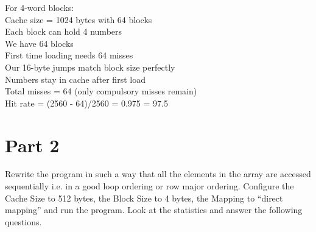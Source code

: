\documentclass{article}\\
\begin{document}
\begin{enumerate}
    For 4-word blocks:\\
    Cache size = 1024 bytes with 64 blocks\\
    Each block can hold 4 numbers\\
    We have 64 blocks\\
    First time loading needs 64 misses\\
    Our 16-byte jumps match block size perfectly\\
    Numbers stay in cache after first load\\
    Total misses = 64 (only compulsory misses remain)\\
    Hit rate = (2560 - 64)/2560 = 0.975 = 97.5%

\end{enumerate}

\section*{Part 2}

Rewrite the program in such a way that all the elements in the array are accessed sequentially i.e. in a good loop ordering or row major ordering. Configure the Cache Size to 512 bytes, the Block Size to 4 bytes, the Mapping to ``direct mapping'' and run the program. Look at the statistics and answer the following questions.
\end{document}
